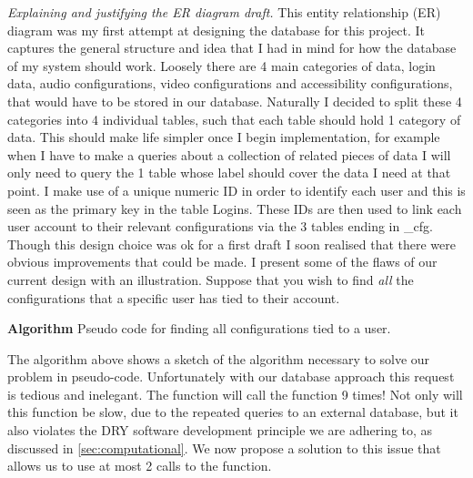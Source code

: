 \textit{Explaining and justifying the ER diagram draft.}
This entity relationship (ER) diagram was my first attempt at
designing the database for this project. It captures the 
general structure and idea that I had in mind for how the
database of my system should work. Loosely there are 4 main 
categories of data, login data, audio configurations,
video configurations and accessibility configurations, that
would have to be stored in our database. Naturally I decided 
to split these 4 categories into 4 individual tables, such 
that each table should hold 1 category of data. This should 
make life simpler once I begin implementation, for example 
when I have to make a queries about a collection of related
pieces of data I will only need to query the 1 table whose 
label should cover the data I need at that point. I make use 
of a unique numeric ID in order to identify each user and this
is seen as the primary key in the table {\sffamily Logins}.
These IDs are then used to link each user account to their 
relevant configurations via the 3 tables ending in 
{\sffamily \_cfg}. Though this design choice was ok for a 
first draft I soon realised that there were obvious
improvements that could be made. I present some of the flaws
of our current design with an illustration. Suppose that you 
wish to find \emph{all} the configurations that a specific 
user has tied to their account.

\begin{algorithm}
\caption*{\textbf{Algorithm} Pseudo code for finding all 
configurations tied to a user.}
\label{alg:long}
\sffamily

\begin{algorithmic}[1]
     
    \State{}
    
    \State{\ldots}
    \State{}

  \EndFunction
\end{algorithmic}

\end{algorithm}

\mdseries

The algorithm above shows a sketch of the algorithm
necessary to solve our problem in pseudo-code. Unfortunately
with our database approach this request is tedious and
inelegant. The function will call the 
function 9 times! Not only will this function be slow, due to
the repeated queries to an external database, but it
also violates the DRY software development principle we are
adhering to, as discussed in \ref{sec:computational}. We now 
propose a solution to this issue that allows us to use at most
2 calls to the  function.


